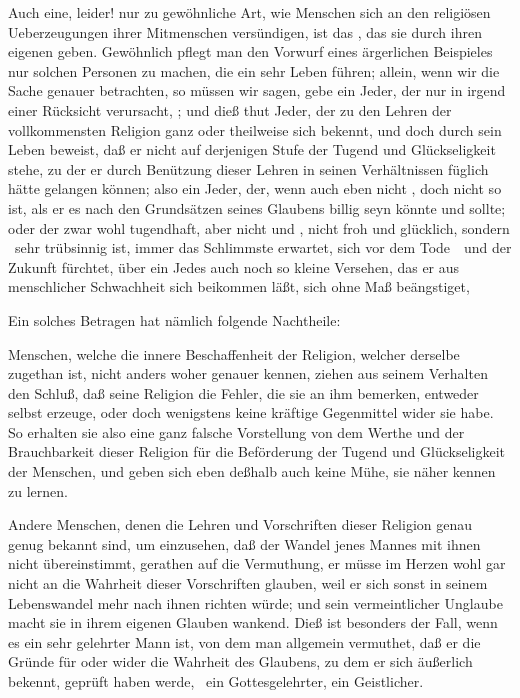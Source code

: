 \begin{aufza}
\item Auch eine, leider! nur zu gewöhnliche Art, wie Menschen sich an den religiösen Ueberzeugungen ihrer Mitmenschen versündigen, ist das , das sie durch ihren eigenen  geben. Gewöhnlich pflegt man den Vorwurf eines ärgerlichen Beispieles nur solchen Personen zu machen, die ein sehr  Leben führen; allein, wenn wir die Sache genauer betrachten, so müssen wir sagen,  gebe ein Jeder, der nur in irgend einer Rücksicht  verursacht, ; und dieß thut Jeder, der zu den Lehren der vollkommensten Religion ganz oder theilweise sich bekennt, und doch durch sein Leben beweist, daß er nicht auf derjenigen Stufe der Tugend und Glückseligkeit stehe, zu der er durch Benützung dieser Lehren in seinen Verhältnissen füglich hätte gelangen können; also ein Jeder, der, wenn  auch eben nicht , doch nicht so  ist, als er es nach den Grundsätzen seines Glaubens billig seyn könnte und sollte; oder der zwar wohl tugendhaft, aber nicht  und , nicht froh und glücklich, sondern \zB\ sehr trübsinnig ist, immer das Schlimmste erwartet, sich vor dem Tode~\ und der Zukunft fürchtet, über ein Jedes auch noch so kleine Versehen, das er aus menschlicher Schwachheit sich beikommen läßt, sich ohne Maß beängstiget, \usw\
\item Ein solches Betragen hat nämlich folgende Nachtheile:
\begin{aufzb} 
\item Menschen, welche die innere Beschaffenheit der Religion, welcher derselbe zugethan ist, nicht anders woher genauer kennen, ziehen aus seinem Verhalten den Schluß, daß seine Religion die Fehler, die sie an ihm bemerken, entweder selbst erzeuge, oder doch wenigstens keine kräftige Gegenmittel wider sie habe. So erhalten sie also eine ganz falsche Vorstellung von dem Werthe und der Brauchbarkeit dieser Religion für die Beförderung der Tugend und Glückseligkeit der Menschen, und geben sich eben deßhalb auch keine Mühe, sie näher kennen zu lernen.
\item Andere Menschen, denen die Lehren und Vorschriften dieser Religion genau genug bekannt sind, um einzusehen, daß der Wandel jenes Mannes mit ihnen nicht übereinstimmt, gerathen auf die Vermuthung, er müsse im Herzen wohl gar nicht an die Wahrheit dieser Vorschriften glauben, weil er sich sonst in seinem Lebenswandel mehr nach ihnen richten würde; und sein vermeintlicher Unglaube macht sie in ihrem eigenen Glauben wankend. Dieß ist besonders der Fall, wenn es ein sehr gelehrter Mann ist, von dem man allgemein vermuthet, daß er die Gründe für oder wider die Wahrheit des Glaubens, zu dem er sich äußerlich bekennt, geprüft haben werde, \zB\ ein Gottesgelehrter, ein Geistlicher.

\end{aufzb}
\end{aufza}

